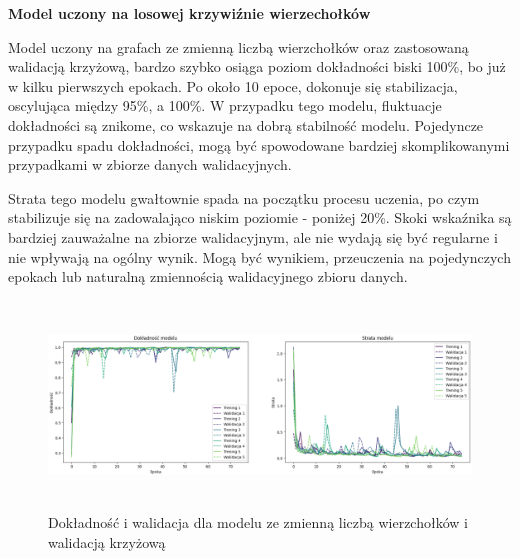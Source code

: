 


\textbf{Model uczony na losowej krzywiźnie wierzechołków}

Model uczony na grafach ze zmienną liczbą wierzchołków oraz zastosowaną walidacją krzyżową,
bardzo szybko osiąga poziom dokładności biski 100\%, bo już w kilku pierwszych epokach.
Po około 10 epoce, dokonuje się stabilizacja, oscylująca między 95\%, a 100\%.
W przypadku tego modelu, fluktuacje dokładności są znikome, co wskazuje na dobrą stabilność modelu.
Pojedyncze przypadku spadu dokładności, mogą być spowodowane bardziej skomplikowanymi
przypadkami w zbiorze danych walidacyjnych.

Strata tego modelu gwałtownie spada na początku procesu uczenia,
po czym stabilizuje się na zadowalająco niskim poziomie - poniżej 20\%.
Skoki wskaźnika są bardziej zauważalne na zbiorze walidacyjnym,
ale nie wydają się być regularne i nie wpływają na ogólny wynik.
Mogą być wynikiem, przeuczenia na pojedynczych epokach lub naturalną zmiennością walidacyjnego zbioru danych.

\begin{figure}[ht]
	\centering
	\includegraphics[height=5.5cm]{resources/tests/images/v3/multiple_edges_crossvalid_img.png}
	\caption{Dokładność i walidacja dla modelu ze zmienną liczbą wierzchołków i walidacją krzyżową}
	\label{Fig:tests-csvar-0a}
\end{figure}
\FloatBarrier

